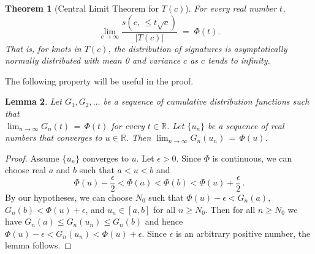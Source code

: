 \documentclass[11pt]{amsart}
\newtheorem{theorem}{Theorem}[section]
\newtheorem{lemma}[theorem]{Lemma}
\theoremstyle{definition}
\theoremstyle{remark}
\numberwithin{equation}{section}
\begin{document}
\begin{theorem}[Central Limit Theorem for $T(c)$]
   \label{thm-CLT}
For every real number $t$,
\begin{equation}
    \label{eq.CLT2m}
    \lim_{c\rightarrow\infty}  \frac{s\left(c, \,\leq t\sqrt{c}\right)}{|T(c)|}   \;=\; \Phi(t).
\end{equation}
That is, for knots in $T(c)$, the distribution of signatures is asymptotically normally distributed  with mean 0 and variance $c$ as $c$ tends to infinity.
\end{theorem}


The following property will be useful in the proof.  

\begin{lemma}
   \label{lem-unifcont}
Let $G_1,G_2,\ldots$ be a sequence of cumulative distribution functions such that\\ $\lim_{n\rightarrow\infty}G_n(t) \,=\,\Phi(t)$ for every $t\in \mathbb{R}$.  
Let $\{u_n\}$ be a sequence of real numbers that converges to $u\in \mathbb{R}$.  Then $\lim_{n\rightarrow\infty}G_n(u_n) \,=\, \Phi(u)$.
\end{lemma}

\begin{proof}
Assume $\{u_n\}$ converges to $u$.  Let $\epsilon>0$.  Since $\Phi$ is continuous, we can choose 
real $a$ and $b$ such that $a<u<b$ and
\[   \Phi(u)-\frac{\epsilon}{2} < \Phi(a)  <   
     \Phi(b) < \Phi(u)+\frac{\epsilon}{2}\,.
\]
By our hypotheses, we can choose $N_0$ such that $\Phi(u)-\epsilon <G_n(a)$, $G_n(b)<\Phi(u)+\epsilon$, and $u_n\in [a,b]$ for all $n\geq N_0$.  
Then for all $n\geq N_0$ we have $G_n(a)\leq G_n(u_n)\leq G_n(b)$ and hence $\Phi(u)-\epsilon < G_n(u_n) <\Phi(u)+\epsilon$.
Since $\epsilon$ is an arbitrary positive number, the lemma follows.
\end{proof}  
\end{document}
